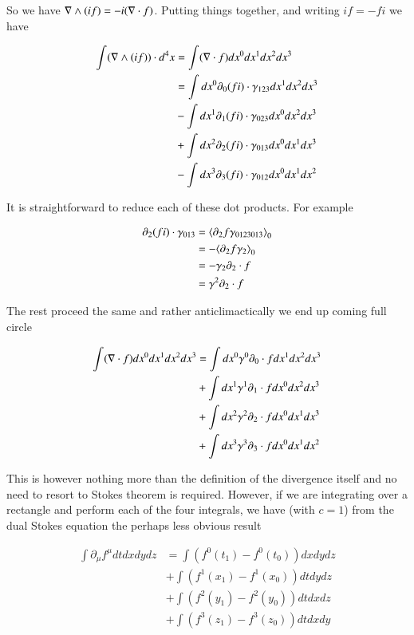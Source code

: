 So we have $\nabla \wedge (i f) = -i (\nabla \cdot f)$.  Putting things together, and writing $i f = -f i$ we have 

\begin{align*}
\int (\nabla \wedge (i f)) \cdot d^4 x
&= 
\int (\nabla \cdot f) dx^0 dx^1 dx^2 dx^3 \\
&=
\int dx^0 \partial_0 (f i) \cdot \gamma_{123} dx^1 dx^2 dx^3 \\
&-\int dx^1 \partial_1 (f i) \cdot \gamma_{023} dx^0 dx^2 dx^3 \\
&+\int dx^2 \partial_2 (f i) \cdot \gamma_{013} dx^0 dx^1 dx^3 \\
&-\int dx^3 \partial_3 (f i) \cdot \gamma_{012} dx^0 dx^1 dx^2 \\
\end{align*}

It is straightforward to reduce each of these dot products.  For example

\begin{align*}
\partial_2 (f i) \cdot \gamma_{013}
&=
{\left\langle{{ \partial_2 f \gamma_{0123013} }}\right\rangle}_{0} \\
&=
-{\left\langle{{ \partial_2 f \gamma_{2} }}\right\rangle}_{0} \\
&=
- \gamma_2 \partial_2 \cdot f \\
&=
\gamma^2 \partial_2 \cdot f 
\end{align*}

The rest proceed the same and rather anticlimactically we end up coming full circle 

\begin{align*}
\int (\nabla \cdot f) dx^0 dx^1 dx^2 dx^3 
&=
\int dx^0 \gamma^0 \partial_0 \cdot f dx^1 dx^2 dx^3 \\
&+\int dx^1 \gamma^1 \partial_1 \cdot f dx^0 dx^2 dx^3 \\
&+\int dx^2 \gamma^2 \partial_2 \cdot f dx^0 dx^1 dx^3 \\
&+\int dx^3 \gamma^3 \partial_3 \cdot f dx^0 dx^1 dx^2 \\
\end{align*}

This is however nothing more than the definition of the divergence itself and no need to resort to Stokes theorem is required.  However, if we are integrating over a rectangle and perform each of the four integrals, we have (with $c=1$) from the dual Stokes equation the perhaps less obvious result

\begin{align*}
\int \partial_\mu f^\mu dt dx dy dz
&=
\int (f^0(t_1) - f^0(t_0)) dx dy dz \\
&+\int (f^1(x_1) - f^1(x_0)) dt dy dz \\
&+\int (f^2(y_1) - f^2(y_0)) dt dx dz \\
&+\int (f^3(z_1) - f^3(z_0)) dt dx dy \\
\end{align*}

